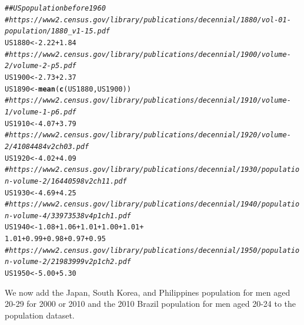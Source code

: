 \documentclass[11pt]{article}\usepackage[]{graphicx}\usepackage[]{color}
\makeatletter
\newcommand{\hlnum}[1]{\textcolor[rgb]{0.686,0.059,0.569}{#1}}%
\newcommand{\hlcom}[1]{\textcolor[rgb]{0.678,0.584,0.686}{\textit{#1}}}%
\newcommand{\hlopt}[1]{\textcolor[rgb]{0,0,0}{#1}}%
\newcommand{\hlstd}[1]{\textcolor[rgb]{0.345,0.345,0.345}{#1}}%
\newcommand{\hlkwb}[1]{\textcolor[rgb]{0.69,0.353,0.396}{#1}}%
\newcommand{\hlkwd}[1]{\textcolor[rgb]{0.737,0.353,0.396}{\textbf{#1}}}%
\newenvironment{kframe}{%
 \def\at@end@of@kframe{}%
 \ifinner\ifhmode%
  \def\at@end@of@kframe{\end{minipage}}%
  \begin{minipage}{\columnwidth}%
 \fi\fi%
 \def\FrameCommand##1{\hskip\@totalleftmargin \hskip-\fboxsep
 \colorbox{shadecolor}{##1}\hskip-\fboxsep
     \hskip-\linewidth \hskip-\@totalleftmargin \hskip\columnwidth}%
 \MakeFramed {\advance\hsize-\width
   \@totalleftmargin\z@ \linewidth\hsize
   \@setminipage}}%
 {\par\unskip\endMakeFramed%
 \at@end@of@kframe}
\newenvironment{knitrout}{}{} %
\makeatother
\begin{document}
\begin{knitrout}
\begin{kframe}
\begin{alltt}
\hlcom{## US population before 1960}
\hlcom{#https://www2.census.gov/library/publications/decennial/1880/vol-01-population/1880_v1-15.pdf}
\hlstd{US1880} \hlkwb{<-} \hlnum{2.22} \hlopt{+} \hlnum{1.84}
\hlcom{#https://www2.census.gov/library/publications/decennial/1900/volume-2/volume-2-p5.pdf}
\hlstd{US1900} \hlkwb{<-} \hlnum{2.73} \hlopt{+} \hlnum{2.37}
\hlstd{US1890} \hlkwb{<-} \hlkwd{mean}\hlstd{(}\hlkwd{c}\hlstd{(US1880,US1900))}
\hlcom{#https://www2.census.gov/library/publications/decennial/1910/volume-1/volume-1-p6.pdf}
\hlstd{US1910} \hlkwb{<-} \hlnum{4.07} \hlopt{+} \hlnum{3.79}
\hlcom{#https://www2.census.gov/library/publications/decennial/1920/volume-2/41084484v2ch03.pdf}
\hlstd{US1920} \hlkwb{<-} \hlnum{4.02} \hlopt{+} \hlnum{4.09}
\hlcom{#https://www2.census.gov/library/publications/decennial/1930/population-volume-2/16440598v2ch11.pdf}
\hlstd{US1930} \hlkwb{<-} \hlnum{4.69} \hlopt{+} \hlnum{4.25}
\hlcom{#https://www2.census.gov/library/publications/decennial/1940/population-volume-4/33973538v4p1ch1.pdf}
\hlstd{US1940} \hlkwb{<-} \hlnum{1.08} \hlopt{+} \hlnum{1.06} \hlopt{+} \hlnum{1.01} \hlopt{+} \hlnum{1.00} \hlopt{+} \hlnum{1.01} \hlopt{+}
  \hlnum{1.01} \hlopt{+} \hlnum{0.99} \hlopt{+} \hlnum{0.98} \hlopt{+} \hlnum{0.97} \hlopt{+} \hlnum{0.95}
\hlcom{#https://www2.census.gov/library/publications/decennial/1950/population-volume-2/21983999v2p1ch2.pdf}
\hlstd{US1950} \hlkwb{<-} \hlnum{5.00} \hlopt{+} \hlnum{5.30}
\end{alltt}
\end{kframe}
\end{knitrout}

We now add the Japan, South Korea, and Philippines population for men aged 
20-29 for 2000 or 2010 and the 2010 Brazil population for men aged 20-24 to 
the population dataset.   
\end{document}
